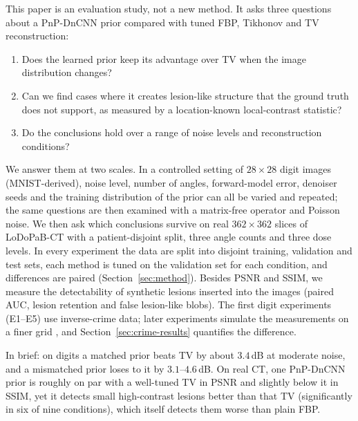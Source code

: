 This paper is an evaluation study, not a new method. It asks three questions about a PnP-DnCNN prior compared with
tuned FBP, Tikhonov and TV reconstruction:
\begin{enumerate}
\item[\textbf{Q1}] Does the learned prior keep its advantage over TV when the image distribution changes?
\item[\textbf{Q2}] Can we find cases where it creates lesion-like structure that the ground truth does not
support, as measured by a location-known local-contrast statistic?
\item[\textbf{Q3}] Do the conclusions hold over a range of noise levels and reconstruction conditions?
\end{enumerate}
We answer them at two scales. In a controlled setting of $28\times28$ digit images (MNIST-derived), noise level,
number of angles, forward-model error, denoiser seeds and the training distribution of the prior can all be varied
and repeated; the same questions are then examined with a matrix-free operator and Poisson noise. We then ask which
conclusions survive on real $362\times362$ slices of LoDoPaB-CT with a patient-disjoint split, three angle counts
and three dose levels. In every experiment the data are split into disjoint training, validation and test sets,
each method is tuned on the validation set for each condition, and differences are paired (Section~\ref{sec:method}).
Besides PSNR and SSIM, we measure the detectability of synthetic lesions inserted into the images (paired AUC,
lesion retention and false lesion-like blobs). The first digit experiments (E1--E5) use inverse-crime data; later
experiments simulate the measurements on a finer grid \citep{wirgin2004}, and
Section~\ref{sec:crime-results} quantifies the difference.

In brief: on digits a matched prior beats TV by about $3.4$\,dB at moderate noise, and a mismatched prior loses to
it by $3.1$--$4.6$\,dB. On real CT, one PnP-DnCNN prior is roughly on par with a well-tuned TV in PSNR and slightly
below it in SSIM, yet it detects small high-contrast lesions better than that TV (significantly in six of nine
conditions), which itself detects them worse than plain FBP.

